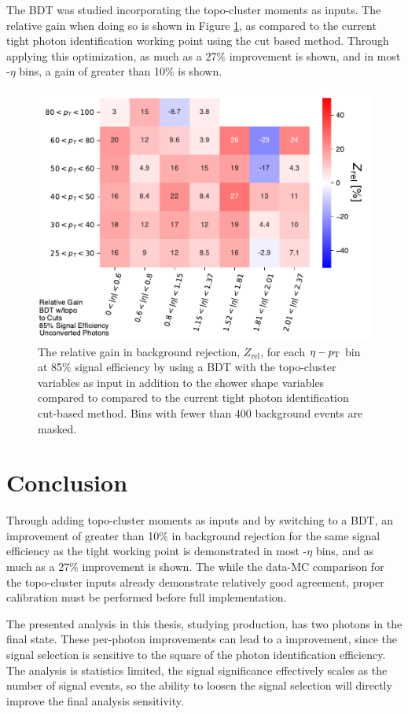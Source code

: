 The \gls{BDT} was studied incorporating the topo-cluster moments as inputs. The relative gain when doing so is shown in Figure \ref{fig:bdt-topo-vs-cuts}, as compared to the current tight photon identification working point using the cut based method. Through applying this optimization, as much as a 27\% improvement is shown, and in most \pt-$\eta$ bins, a gain of greater than 10\% is shown.
\begin{figure}[!htb]
    \centering
    \includegraphics[width=.85\textwidth]{chapters/chapter4_photonID/images/BDTtopo_v_cuts_normed.pdf}
    \caption[The relative gain in background rejection by using a \gls{BDT} with topo-cluster variables compared to the current tight photon identification methods]
    {The relative gain in background rejection, $Z_{\text{rel}}$, for each $\eta-p_{\text{T}}$ bin at 85\% signal efficiency by using a \gls{BDT} with the topo-cluster variables as input in addition to the shower shape variables compared to compared to the current tight photon identification cut-based method. Bins with fewer than 400 background events are masked.}
    \label{fig:bdt-topo-vs-cuts}
\end{figure}

\section{Conclusion}

Through adding topo-cluster moments as inputs and by switching to a \gls{BDT}, an improvement of greater than 10\% in background rejection for the same signal efficiency as the tight working point is demonstrated in most \pt-$\eta$ bins, and as much as a 27\% improvement is shown. The while the data-MC comparison for the topo-cluster inputs already demonstrate relatively good agreement, proper calibration must be performed before full implementation. 

The presented analysis in this thesis, studying \hhyybb production, has two photons in the final state. These per-photon improvements can lead to a improvement, since the signal selection is sensitive to the square of the photon identification efficiency. The analysis is statistics limited, the signal significance effectively scales as the number of signal events, so the ability to loosen the signal selection will directly improve the final analysis sensitivity.